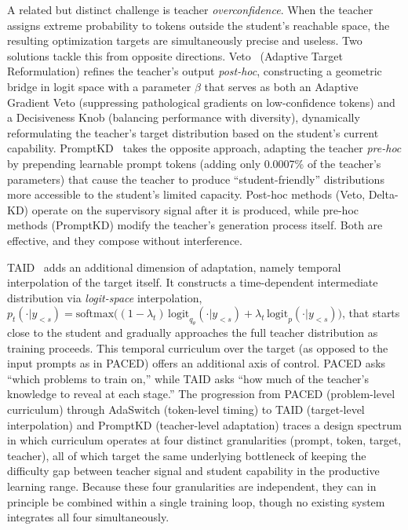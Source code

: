 \documentclass{article} %
\begin{document}
A related but distinct challenge is teacher \emph{overconfidence}. When the teacher assigns extreme probability to tokens outside the student's reachable space, the resulting optimization targets are simultaneously precise and useless. Two solutions tackle this from opposite directions. Veto~\citep{2601.07155} (Adaptive Target Reformulation) refines the teacher's output \emph{post-hoc}, constructing a geometric bridge in logit space with a parameter $\beta$ that serves as both an Adaptive Gradient Veto (suppressing pathological gradients on low-confidence tokens) and a Decisiveness Knob (balancing performance with diversity), dynamically reformulating the teacher's target distribution based on the student's current capability. PromptKD~\citep{2402.12842} takes the opposite approach, adapting the teacher \emph{pre-hoc} by prepending learnable prompt tokens (adding only 0.0007\% of the teacher's parameters) that cause the teacher to produce ``student-friendly'' distributions more accessible to the student's limited capacity. Post-hoc methods (Veto, Delta-KD) operate on the supervisory signal after it is produced, while pre-hoc methods (PromptKD) modify the teacher's generation process itself. Both are effective, and they compose without interference.

TAID~\citep{2501.16937} adds an additional dimension of adaptation, namely temporal interpolation of the target itself. It constructs a time-dependent intermediate distribution via \emph{logit-space} interpolation, $p_t(\cdot|y_{<s}) = \mathrm{softmax}\big((1-\lambda_t)\,\mathrm{logit}_{q_\theta}(\cdot|y_{<s}) + \lambda_t\,\mathrm{logit}_p(\cdot|y_{<s})\big)$, that starts close to the student and gradually approaches the full teacher distribution as training proceeds. This temporal curriculum over the target (as opposed to the input prompts as in PACED) offers an additional axis of control. PACED asks ``which problems to train on,'' while TAID asks ``how much of the teacher's knowledge to reveal at each stage.'' The progression from PACED (problem-level curriculum) through AdaSwitch (token-level timing) to TAID (target-level interpolation) and PromptKD (teacher-level adaptation) traces a design spectrum in which curriculum operates at four distinct granularities (prompt, token, target, teacher), all of which target the same underlying bottleneck of keeping the difficulty gap between teacher signal and student capability in the productive learning range. Because these four granularities are independent, they can in principle be combined within a single training loop, though no existing system integrates all four simultaneously.
\end{document}
